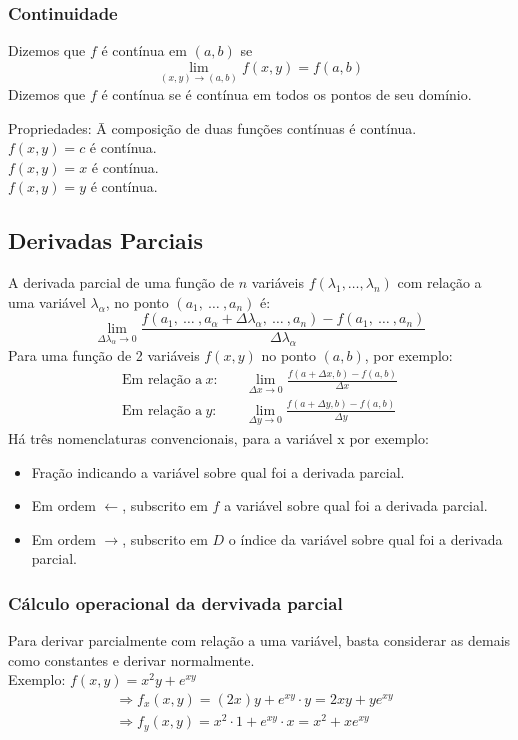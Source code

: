\documentclass{article}
\begin{document}
\subsubsection{Continuidade}
Dizemos que $f$ é contínua em $(a,b)$ se
\[ \lim_{(x,y) \to (a,b)} f(x,y) = f(a,b) \]
Dizemos que $f$ é contínua se é contínua em todos os pontos de seu domínio.
\begin{tabbing}
  Propriedades: \= A composição de duas funções contínuas é contínua.\\
  \> $f(x,y) = c$ é contínua.\\
  \> $f(x,y) = x$ é contínua.\\
  \> $f(x,y) = y$ é contínua.
\end{tabbing}


\pagebreak


\subsection{Derivadas Parciais}
A derivada parcial de uma função de $n$ variáveis $f(\lambda_1, \hdots, \lambda_n)$ com relação a uma variável $\lambda_\alpha$, no ponto $(a_1, \> \hdots \> , a_n)$ é:
\[ \lim_{\Delta \lambda_\alpha \to 0} \frac{f(a_1, \> \hdots \> , a_\alpha + \Delta \lambda_\alpha, \> \hdots \> , a_n) - f(a_1, \> \hdots \> , a_n)}{\Delta \lambda_\alpha} \]
Para uma função de 2 variáveis $f(x,y)$ no ponto $(a, b)$, por exemplo:
\begin{align*}
  \text{Em relação a}\ x:& \quad \lim_{\Delta x \to 0} \frac{f(a + \Delta x, b) - f(a, b)}{\Delta x} \\[5pt]
  \text{Em relação a}\ y:& \quad \lim_{\Delta y \to 0} \frac{f(a + \Delta y, b) - f(a, b)}{\Delta y}
\end{align*}
Há três nomenclaturas convencionais, para a variável x por exemplo:
\begin{itemize}
\item{ Fração indicando a variável sobre qual foi a derivada parcial.}
\item{ Em ordem $\leftarrow$, subscrito em $f$ a variável sobre qual foi a derivada parcial.}
\item{ Em ordem $\rightarrow$, subscrito em $D$ o índice da variável sobre qual foi a derivada parcial.}
\end{itemize}

\subsubsection{Cálculo operacional da dervivada parcial}
Para derivar parcialmente com relação a uma variável, basta considerar as demais como constantes e derivar normalmente.\\[5pt]
Exemplo: $f(x,y) = x^2y + e^{xy}$
\begin{align*}
  & \Rightarrow f_x(x,y) = (2x)y + e^{xy} \cdot y = 2xy + ye^{xy}&& \\[5pt]
  & \Rightarrow f_y(x,y) = x^2 \cdot 1 + e^{xy}\cdot x = x^2 + xe^{xy} &&
\end{align*}
\end{document}
